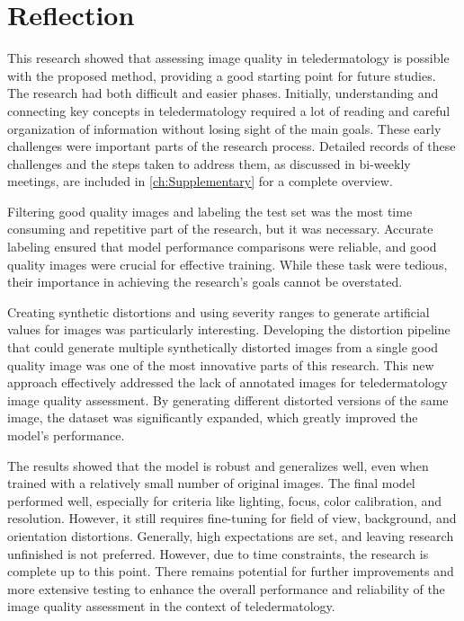 \clearpage
\section{Reflection}
\label{sec:Reflection}
This research showed that assessing image quality in teledermatology is possible with the proposed method, providing a good starting point for future studies. The research had both difficult and easier phases. Initially, understanding and connecting key concepts in teledermatology required a lot of reading and careful organization of information without losing sight of the main goals. These early challenges were important parts of the research process. Detailed records of these challenges and the steps taken to address them, as discussed in bi-weekly meetings, are included in \autoref{ch:Supplementary} for a complete overview. \par
\vspace{\baselineskip}
\noindent
Filtering good quality images and labeling the test set was the most time consuming and repetitive part of the research, but it was necessary. Accurate labeling ensured that model performance comparisons were reliable, and good quality images were crucial for effective training. While these task were tedious, their importance in achieving the research’s goals cannot be overstated. \par
\vspace{\baselineskip}
\noindent
Creating synthetic distortions and using severity ranges to generate artificial values for images was particularly interesting. Developing the distortion pipeline that could generate multiple synthetically distorted images from a single good quality image was one of the most innovative parts of this research. This new approach effectively addressed the lack of annotated images for teledermatology image quality assessment. By generating different distorted versions of the same image, the dataset was significantly expanded, which greatly improved the model’s performance. \par
\vspace{\baselineskip}
\noindent
The results showed that the model is robust and generalizes well, even when trained with a relatively small number of original images. The final model performed well, especially for criteria like lighting, focus, color calibration, and resolution. However, it still requires fine-tuning for field of view, background, and orientation distortions. Generally, high expectations are set, and leaving research unfinished is not preferred. However, due to time constraints, the research is complete up to this point. There remains potential for further improvements and more extensive testing to enhance the overall performance and reliability of the image quality assessment in the context of teledermatology. \par

